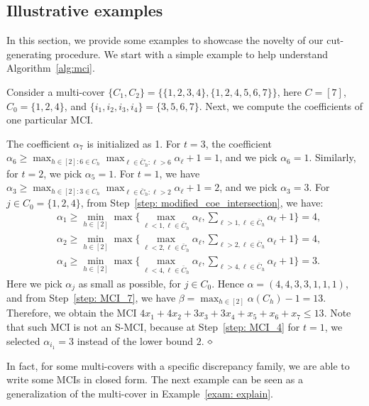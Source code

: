 \subsection{Illustrative examples}

In this section, we provide some examples to showcase the novelty of our cut-generating procedure.
We start with a simple example to help understand Algorithm~\ref{alg:mci}.

\begin{example}
\label{exam: explain}
Consider a multi-cover $\{C_1, C_2\} = \{\{1,2,3,4\}, \{1,2,4,5,6,7\}\}$, here $C = [7]$, $C_0 = \{1,2,4\}$, and $\{i_1, i_2, i_3, i_4\} = \{3,5,6,7\}$. 
Next, we compute the coefficients of one particular MCI.

The coefficient $\alpha_7$ is initialized as 1. 
For $t=3$, the coefficient $\alpha_6 \geq \max_{h \in [2]: 6 \in C_h} \max_{\ell \in \bar{C}_h: \ell > 6} \alpha_\ell + 1 = 1$, and we pick $\alpha_6 = 1$. 
Similarly, for $t=2$, we pick $\alpha_5 = 1$. 
For $t=1$, we have $\alpha_3 \geq \max_{h \in [2]: 3 \in C_h} \max_{\ell \in \bar{C}_h: \ell > 2} \alpha_\ell + 1 = 2$, and we pick $\alpha_3 = 3$. 
For $j \in C_0 = \{1,2,4\}$, from Step~\ref{step: modified_coe_intersection}, we have:
\begin{align*}
& \alpha_1 \geq \min_{h \in [2]} \max \{\max_{\ell < 1, \ell \in \bar{C}_h} \alpha_\ell, \sum_{\ell > 1, \ell \in \bar{C}_h} \alpha_\ell + 1\} = 4,\\
& \alpha_2 \geq \min_{h \in [2]} \max \{\max_{\ell < 2, \ell \in \bar{C}_h} \alpha_\ell, \sum_{\ell > 2, \ell \in \bar{C}_h} \alpha_\ell + 1\} = 4,\\
& \alpha_4 \geq \min_{h \in [2]} \max \{\max_{\ell < 4, \ell \in \bar{C}_h} \alpha_\ell, \sum_{\ell > 4, \ell \in \bar{C}_h} \alpha_\ell + 1\} = 3.
\end{align*}
Here we pick $\alpha_j$ as small as possible, for $j \in C_0$. 
Hence $\alpha = (4,4,3,3,1,1,1)$, and from Step~\ref{step: MCI_7}, we have $\beta = \max_{h \in [2]}\alpha(C_h) - 1 = 13$.
Therefore, we obtain the MCI $4x_1 + 4x_2 + 3x_3 + 3x_4 + x_5 + x_6 + x_7 \leq 13$. 
Note that such MCI is not an S-MCI, because at Step~\ref{step: MCI_4} for $t=1$, we selected $\alpha_{i_1} = 3$ instead of the lower bound $2$. 
$\hfill\diamond$
\end{example}



In fact, for some multi-covers with a specific discrepancy family, we are able to write some  MCIs in closed form. 
The next example can be seen as a generalization of the multi-cover in Example~\ref{exam: explain}. 

